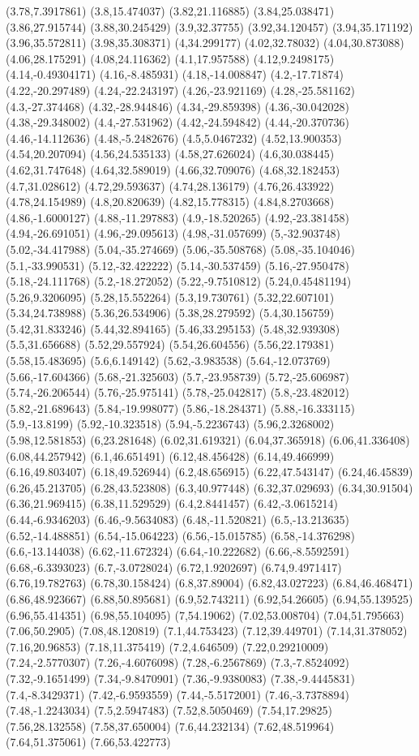 (3.78,7.3917861) (3.8,15.474037) (3.82,21.116885) (3.84,25.038471) (3.86,27.915744) (3.88,30.245429) (3.9,32.37755) (3.92,34.120457) (3.94,35.171192) (3.96,35.572811) (3.98,35.308371) (4,34.299177) (4.02,32.78032) (4.04,30.873088) (4.06,28.175291) (4.08,24.116362) (4.1,17.957588) (4.12,9.2498175) (4.14,-0.49304171) (4.16,-8.485931) (4.18,-14.008847) (4.2,-17.71874) (4.22,-20.297489) (4.24,-22.243197) (4.26,-23.921169) (4.28,-25.581162) (4.3,-27.374468) (4.32,-28.944846) (4.34,-29.859398) (4.36,-30.042028) (4.38,-29.348002) (4.4,-27.531962) (4.42,-24.594842) (4.44,-20.370736) (4.46,-14.112636) (4.48,-5.2482676) (4.5,5.0467232) (4.52,13.900353) (4.54,20.207094) (4.56,24.535133) (4.58,27.626024) (4.6,30.038445) (4.62,31.747648) (4.64,32.589019) (4.66,32.709076) (4.68,32.182453) (4.7,31.028612) (4.72,29.593637) (4.74,28.136179) (4.76,26.433922) (4.78,24.154989) (4.8,20.820639) (4.82,15.778315) (4.84,8.2703668) (4.86,-1.6000127) (4.88,-11.297883) (4.9,-18.520265) (4.92,-23.381458) (4.94,-26.691051) (4.96,-29.095613) (4.98,-31.057699) (5,-32.903748) (5.02,-34.417988) (5.04,-35.274669) (5.06,-35.508768) (5.08,-35.104046) (5.1,-33.990531) (5.12,-32.422222) (5.14,-30.537459) (5.16,-27.950478) (5.18,-24.111768) (5.2,-18.272052) (5.22,-9.7510812) (5.24,0.45481194) (5.26,9.3206095) (5.28,15.552264) (5.3,19.730761) (5.32,22.607101) (5.34,24.738988) (5.36,26.534906) (5.38,28.279592) (5.4,30.156759) (5.42,31.833246) (5.44,32.894165) (5.46,33.295153) (5.48,32.939308) (5.5,31.656688) (5.52,29.557924) (5.54,26.604556) (5.56,22.179381) (5.58,15.483695) (5.6,6.149142) (5.62,-3.983538) (5.64,-12.073769) (5.66,-17.604366) (5.68,-21.325603) (5.7,-23.958739) (5.72,-25.606987) (5.74,-26.206544) (5.76,-25.975141) (5.78,-25.042817) (5.8,-23.482012) (5.82,-21.689643) (5.84,-19.998077) (5.86,-18.284371) (5.88,-16.333115) (5.9,-13.8199) (5.92,-10.323518) (5.94,-5.2236743) (5.96,2.3268002) (5.98,12.581853) (6,23.281648) (6.02,31.619321) (6.04,37.365918) (6.06,41.336408) (6.08,44.257942) (6.1,46.651491) (6.12,48.456428) (6.14,49.466999) (6.16,49.803407) (6.18,49.526944) (6.2,48.656915) (6.22,47.543147) (6.24,46.45839) (6.26,45.213705) (6.28,43.523808) (6.3,40.977448) (6.32,37.029693) (6.34,30.91504) (6.36,21.969415) (6.38,11.529529) (6.4,2.8441457) (6.42,-3.0615214) (6.44,-6.9346203) (6.46,-9.5634083) (6.48,-11.520821) (6.5,-13.213635) (6.52,-14.488851) (6.54,-15.064223) (6.56,-15.015785) (6.58,-14.376298) (6.6,-13.144038) (6.62,-11.672324) (6.64,-10.222682) (6.66,-8.5592591) (6.68,-6.3393023) (6.7,-3.0728024) (6.72,1.9202697) (6.74,9.4971417) (6.76,19.782763) (6.78,30.158424) (6.8,37.89004) (6.82,43.027223) (6.84,46.468471) (6.86,48.923667) (6.88,50.895681) (6.9,52.743211) (6.92,54.26605) (6.94,55.139525) (6.96,55.414351) (6.98,55.104095) (7,54.19062) (7.02,53.008704) (7.04,51.795663) (7.06,50.2905) (7.08,48.120819) (7.1,44.753423) (7.12,39.449701) (7.14,31.378052) (7.16,20.96853) (7.18,11.375419) (7.2,4.646509) (7.22,0.29210009) (7.24,-2.5770307) (7.26,-4.6076098) (7.28,-6.2567869) (7.3,-7.8524092) (7.32,-9.1651499) (7.34,-9.8470901) (7.36,-9.9380083) (7.38,-9.4445831) (7.4,-8.3429371) (7.42,-6.9593559) (7.44,-5.5172001) (7.46,-3.7378894) (7.48,-1.2243034) (7.5,2.5947483) (7.52,8.5050469) (7.54,17.29825) (7.56,28.132558) (7.58,37.650004) (7.6,44.232134) (7.62,48.519964) (7.64,51.375061) (7.66,53.422773) 